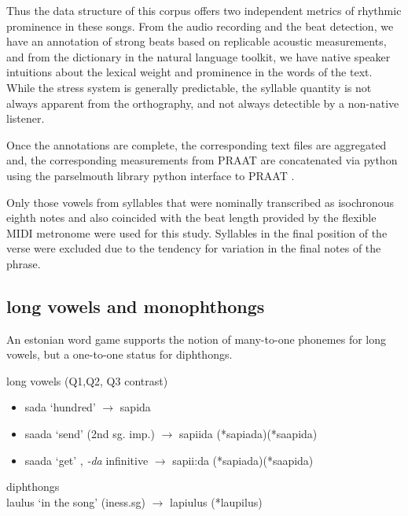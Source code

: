 Thus the data structure of this corpus offers two independent metrics of rhythmic prominence in these songs. From the audio recording and the beat detection, we have an annotation of strong beats based on replicable acoustic measurements, and from the dictionary in the natural language toolkit, we have native speaker intuitions about the lexical weight and prominence in the words of the text. While the stress system is generally predictable, the syllable quantity is not always apparent from the orthography, and not always detectible by a non-native listener. 



Once the annotations are complete, the corresponding text files are aggregated and, the corresponding measurements from PRAAT are concatenated via python using the parselmouth library python interface to PRAAT \citep{parselmouth2018, python1995}. 

Only those vowels from syllables that were nominally transcribed as isochronous eighth notes and also coincided with the beat length provided by the flexible MIDI metronome were used for this study.  Syllables in the final position of the verse were excluded due to the tendency for variation in the final notes of the phrase. 
\subsection{long vowels and monophthongs}
An estonian word game supports the notion of many-to-one phonemes for long vowels, but a one-to-one status for diphthongs.

\begin{exe}

\ex  long vowels (Q1,Q2, Q3 contrast) 
	\begin{itemize} 
	\item sada `hundred' $\rightarrow$ sapida 
	\item  saada `send' (2nd sg. imp.) $\rightarrow$ sapiida (*sapiada)(*saapida)
	\item saada `get' , {\it -da} infinitive $\rightarrow$ sapii:da (*sapiada)(*saapida)
	\end{itemize}
\ex 	 diphthongs \\
laulus `in the song' (iness.sg) $\rightarrow$ lapiulus (*laupilus)
\end{exe}


